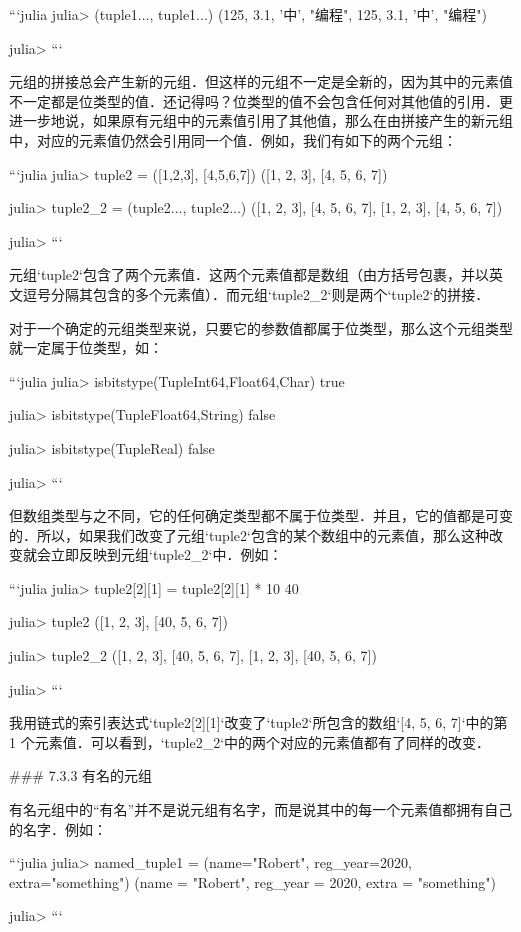```julia
julia> (tuple1..., tuple1...)
(125, 3.1, '中', "编程", 125, 3.1, '中', "编程")

julia> 
```

元组的拼接总会产生新的元组．但这样的元组不一定是全新的，因为其中的元素值不一定都是位类型的值．还记得吗？位类型的值不会包含任何对其他值的引用．更进一步地说，如果原有元组中的元素值引用了其他值，那么在由拼接产生的新元组中，对应的元素值仍然会引用同一个值．例如，我们有如下的两个元组：

```julia
julia> tuple2 = ([1,2,3], [4,5,6,7])
([1, 2, 3], [4, 5, 6, 7])

julia> tuple2_2 = (tuple2..., tuple2...)
([1, 2, 3], [4, 5, 6, 7], [1, 2, 3], [4, 5, 6, 7])

julia> 
```

元组`tuple2`包含了两个元素值．这两个元素值都是数组（由方括号包裹，并以英文逗号分隔其包含的多个元素值）．而元组`tuple2_2`则是两个`tuple2`的拼接．

对于一个确定的元组类型来说，只要它的参数值都属于位类型，那么这个元组类型就一定属于位类型，如：

```julia
julia> isbitstype(Tuple{Int64,Float64,Char})
true

julia> isbitstype(Tuple{Float64,String})
false

julia> isbitstype(Tuple{Real})
false

julia> 
```

但数组类型与之不同，它的任何确定类型都不属于位类型．并且，它的值都是可变的．所以，如果我们改变了元组`tuple2`包含的某个数组中的元素值，那么这种改变就会立即反映到元组`tuple2_2`中．例如：

```julia
julia> tuple2[2][1] = tuple2[2][1] * 10
40

julia> tuple2
([1, 2, 3], [40, 5, 6, 7])

julia> tuple2_2
([1, 2, 3], [40, 5, 6, 7], [1, 2, 3], [40, 5, 6, 7])

julia> 
```

我用链式的索引表达式`tuple2[2][1]`改变了`tuple2`所包含的数组`[4, 5, 6, 7]`中的第 1 个元素值．可以看到，`tuple2_2`中的两个对应的元素值都有了同样的改变．

### 7.3.3 有名的元组

有名元组中的“有名”并不是说元组有名字，而是说其中的每一个元素值都拥有自己的名字．例如：

```julia 
julia> named_tuple1 = (name="Robert", reg_year=2020, extra="something")
(name = "Robert", reg_year = 2020, extra = "something")

julia> 
```

